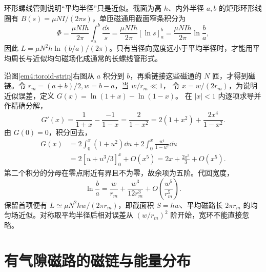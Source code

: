 环形螺线管则说明“平均半径”只是近似。截面为高 $h$、内外半径 $a,b$ 的矩形环形线圈有 $B(s)=\mu NI/(2\pi s)$，单匝磁通用截面窄条积分为
\[
\Phi=\frac{\mu NIh}{2\pi}\int_a^b\frac{\dd s}{s}
=\frac{\mu NIh}{2\pi}[\ln s]_a^b
=\frac{\mu NIh}{2\pi}\ln\frac ba,
\]因此 $L=\mu N^2h\ln(b/a)/(2\pi)$。只有当径向宽度远小于平均半径时，才能用平均周长与近似均匀磁场化成通常的长螺线管形式。


沿图\ref{em4:toroid-strip}右图从 $a$ 积分到 $b$，再乘链接这些磁通的 $N$ 匝，才得到磁链。令 $r_m=(a+b)/2,w=b-a$，当 $w/r_m\ll1$，
令 $x=w/(2r_m)$，为说明近似误差，定义 $G(x)=\ln(1+x)-\ln(1-x)$。
在 $|x|<1$ 内逐项求导并作精确分解，
\[
 G'(x)=\frac1{1+x}-\frac{-1}{1-x}
 =\frac2{1-x^2}=2(1+x^2)+\frac{2x^4}{1-x^2}.
\]
由 $G(0)=0$，积分回去，
\[
 \begin{aligned}
 G(x)&=2\int_0^x(1+u^2)\dd u
       +2\int_0^x\frac{u^4}{1-u^2}\dd u\\
 &=2[u+u^3/3]_0^x+O(x^5)=2x+\frac{2x^3}{3}+O(x^5).
 \end{aligned}
\]
第二个积分的分母在零点附近有界且不为零，故余项为五阶。代回宽度，
\[
 \ln\frac ba=\frac w{r_m}+\frac{w^3}{12r_m^3}
 +O\!\left(\frac{w^5}{r_m^5}\right).
\]
保留首项便有 $L\simeq\mu N^2hw/(2\pi r_m)$，即截面积 $S=hw$、平均磁路长 $2\pi r_m$ 的均匀场近似。对称取平均半径后相对误差从 $(w/r_m)^2$ 阶开始，宽环不能直接忽略。


\section{有气隙磁路的磁链与能量分布}

